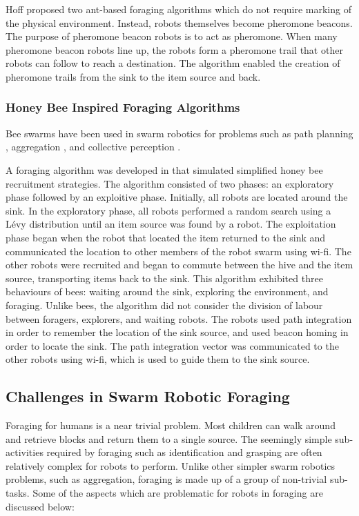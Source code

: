 Hoff \cite{hoff2010two} proposed two ant-based foraging algorithms which do not require marking of the physical environment. Instead, robots themselves become pheromone beacons. The purpose of pheromone beacon robots is to act as pheromone. When many pheromone beacon robots line up, the robots form a pheromone trail that other robots can follow to reach a destination. The algorithm enabled the creation of pheromone trails from the sink to the item source and back.

\subsubsection{Honey Bee Inspired Foraging Algorithms}
Bee swarms have been used in swarm robotics for problems such as path planning \cite{lin2009chaotic}, aggregation \cite{kernbach2009re}, and collective perception \cite{schmickl2007collective}. 

A foraging algorithm was developed in \cite{alers2014biologically} that simulated simplified honey bee recruitment strategies. The algorithm consisted of two phases: an exploratory phase followed by an exploitive phase. Initially, all robots are located around the sink. In the exploratory phase, all robots performed a random search using a L\'evy distribution until an item source was found by a robot. The exploitation phase began when the robot that located the item returned to the sink and communicated the location to other members of the robot swarm using wi-fi. The other robots were recruited and began to commute between the hive and the item source, transporting items back to the sink. This algorithm exhibited three behaviours of bees: waiting around the sink, exploring the environment, and foraging. Unlike bees, the algorithm did not consider the division of labour between foragers, explorers, and waiting robots. The robots used path integration in order to remember the location of the sink source, and used beacon homing in order to locate the sink. The path integration vector was communicated to the other robots using wi-fi, which is used to guide them to the sink source. 

\subsection{Challenges in Swarm Robotic Foraging}
\label{challengesinforaging}

Foraging for humans is a near trivial problem. Most children can walk around and retrieve blocks and return them to a single source. The seemingly simple sub-activities required by foraging such as identification and grasping are often relatively complex for robots to perform. Unlike other simpler swarm robotics problems, such as aggregation, foraging is made up of a group of non-trivial sub-tasks. Some of the aspects which are problematic for robots in foraging are discussed below:


